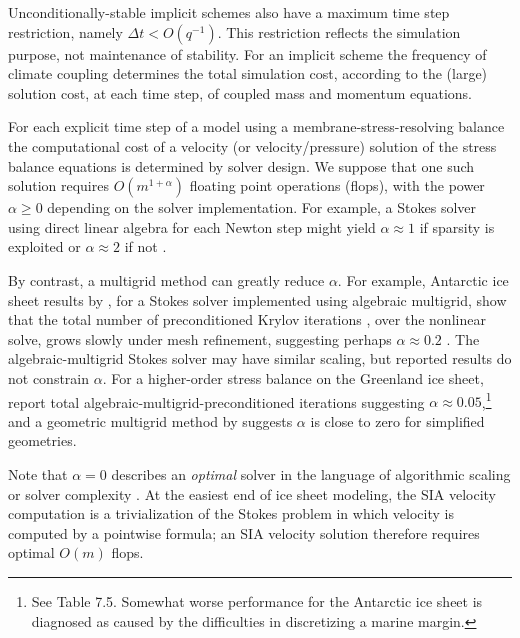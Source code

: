 \documentclass[review,letterpaper]{igs}
\begin{document}
Unconditionally-stable implicit schemes also have a maximum time step restriction, namely $\Delta t < O(q^{-1})$.  This restriction reflects the simulation purpose, not maintenance of stability.  For an implicit scheme the frequency of climate coupling determines the total simulation cost, according to the (large) solution cost, at each time step, of coupled mass and momentum equations.

For each explicit time step of a model using a membrane-stress-resolving balance the computational cost of a velocity (or velocity/pressure) solution of the stress balance equations is determined by solver design.  We suppose that one such solution requires $O(m^{1+\alpha})$ floating point operations (flops),  with the power $\alpha\ge 0$ depending on the solver implementation.  For example, a Stokes solver using direct linear algebra for each Newton step might yield $\alpha \approx 1$ if sparsity is exploited or $\alpha \approx 2$ if not \citep{Bueler2021}.


By contrast, a multigrid method \citep{Trottenbergetal2001} can greatly reduce $\alpha$.  For example, Antarctic ice sheet results by \cite{IsaacStadlerGhattas2015}, for a Stokes solver implemented using algebraic multigrid, show that the total number of preconditioned Krylov iterations \citep{Bueler2021}, over the nonlinear solve, grows slowly under mesh refinement, suggesting perhaps $\alpha\approx 0.2$ \citep[Table 8.1]{IsaacStadlerGhattas2015}.  The \cite{Lengetal2012} algebraic-multigrid Stokes solver may have similar scaling, but reported results do not constrain $\alpha$.  For a higher-order stress balance on the Greenland ice sheet, \cite{Tuminaroetal2016} report total algebraic-multigrid-preconditioned iterations suggesting $\alpha \approx 0.05$,\footnote{See Table 7.5.  Somewhat worse performance for the Antarctic ice sheet is diagnosed as caused by the difficulties in discretizing a marine margin.} and a geometric multigrid method by \citep{BrownSmithAhmadia2013} suggests $\alpha$ is close to zero for simplified geometries.

Note that $\alpha=0$ describes an \emph{optimal} solver in the language of algorithmic scaling or solver complexity \citep{Bueler2021}.  At the easiest end of ice sheet modeling, the SIA velocity computation is a trivialization of the Stokes problem in which velocity is computed by a pointwise formula; an SIA velocity solution therefore requires optimal $O(m)$ flops.
\end{document}

